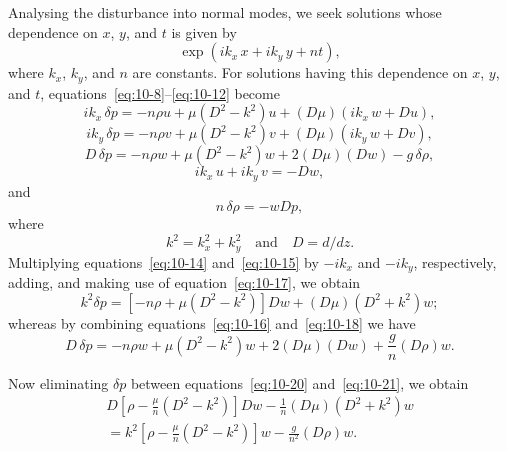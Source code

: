 Analysing the disturbance into normal modes, we seek solutions whose dependence on $x$, $y$, and $t$ is given by
\begin{equation}
\label{eq:10-13}
\exp(ik_x\,x + ik_y\,y + nt),
\end{equation}
where $k_x$, $k_y$, and $n$ are constants. For solutions having this dependence on $x$, $y$, and $t$, equations~\eqref{eq:10-8}--\eqref{eq:10-12} become
\begin{equation}
\label{eq:10-14}
ik_x\,\delta p = -n\rho u + \mu(D^2-k^2)u + (D\mu)(ik_x\,w+Du),
\end{equation}
\begin{equation}
\label{eq:10-15}
ik_y\,\delta p = -n\rho v + \mu(D^2-k^2)v + (D\mu)(ik_y\,w+Dv),
\end{equation}
\begin{equation}
\label{eq:10-16}
D\,\delta p = -n\rho w + \mu(D^2-k^2)w + 2(D\mu)(Dw) - g\,\delta\rho,
\end{equation}
\begin{equation}
\label{eq:10-17}
ik_x\,u + ik_y\,v = -Dw,
\end{equation}
and
\begin{equation}
\label{eq:10-18}
n\,\delta\rho = -wDp,
\end{equation}
where
\begin{equation}
\label{eq:10-19}
k^2 = k_x^2+k_y^2 \quad\text{and}\quad D = d/dz.
\end{equation}
Multiplying equations~\eqref{eq:10-14} and~\eqref{eq:10-15} by $-ik_x$ and $-ik_y$, respectively, adding, and making use of equation~\eqref{eq:10-17}, we obtain
\begin{equation}
\label{eq:10-20}
k^2\delta p = [-n\rho+\mu(D^2-k^2)]Dw + (D\mu)(D^2+k^2)w;
\end{equation}
whereas by combining equations~\eqref{eq:10-16} and~\eqref{eq:10-18} we have
\begin{equation}
\label{eq:10-21}
D\,\delta p = -n\rho w + \mu(D^2-k^2)w + 2(D\mu)(Dw) + \frac{g}{n}(D\rho)w.
\end{equation}

Now eliminating $\delta p$ between equations~\eqref{eq:10-20} and~\eqref{eq:10-21}, we obtain
\begin{align}
\label{eq:10-22}
D\!\left[\rho-\frac{\mu}{n}(D^2-k^2)\right]\!Dw - \frac{1}{n}(D\mu)(D^2+k^2)w \nonumber\\
= k^2\!\left[\rho-\frac{\mu}{n}(D^2-k^2)\right]\!w - \frac{g}{n^2}(D\rho)w. \qquad\quad
\end{align}

